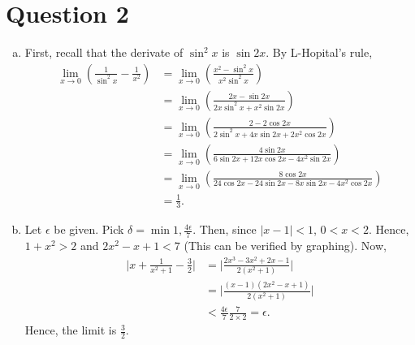 \documentclass[12pt,a4paper]{article}
\begin{document}
	\section*{Question 2}
	\begin{enumerate}[a.]
	    \item First, recall that the derivate of $\sin^2{x}$ is $\sin{2x}$. By L-Hopital's rule,
	    \begin{align*}
	   \lim_{x \rightarrow 0} \left( \frac{1}{\sin^2{x}}-\frac{1}{x^2} \right) &= \lim_{x \rightarrow 0} \left( \frac{x^2-\sin^2{x}}{x^2 \sin^2{x}} \right) \\
	   &=\lim_{x \rightarrow 0} \left( \frac{2x - \sin{2x}}{2x\sin^2{x}+x^2\sin{2x}}  \right) \\
	   &= \lim_{x \rightarrow 0 } \left( \frac{2 -2 \cos{2x}}{2\sin^2{x}+4x\sin{2x}+2x^2\cos{2x}} \right)  \\
	   &= \lim_{x \rightarrow 0 } \left( \frac{4 \sin{2x}}{6\sin{2x}+12x\cos{2x}-4x^2\sin{2x}} \right) \\
	   &= \lim_{x \rightarrow 0} \left( 
	   \frac{8 \cos{2x}}{24\cos{2x}-24\sin{2x}-8x\sin{2x}-4x^2\cos{2x}}\right) \\
	   &= \frac{1}{3}.
	    \end{align*}
	    \item Let $\epsilon$ be given. Pick $\delta = \min{1,\frac{4\epsilon}{7}}$. Then, since $|x-1| < 1$, $0<x<2$. Hence, $1+x^2>2$ and $2x^2-x+1 < 7$ (This can be verified by graphing). Now, 
	    \begin{align*}
	        \lvert x+\frac{1}{x^2+1}-\frac{3}{2} \rvert 	        &= \lvert \frac{2x^3-3x^2+2x-1}{2(x^2+1)}\rvert \\ 
	        &= \lvert \frac{(x-1)(2x^2-x+1)}{2(x^2+1)}\rvert \\
	        &< \frac{4\epsilon}{7} \frac{7}{2 \times 2} = \epsilon.
	    \end{align*}
	    Hence, the limit is $\frac{3}{2}$.
	\end{enumerate}
	
	
\end{document}
